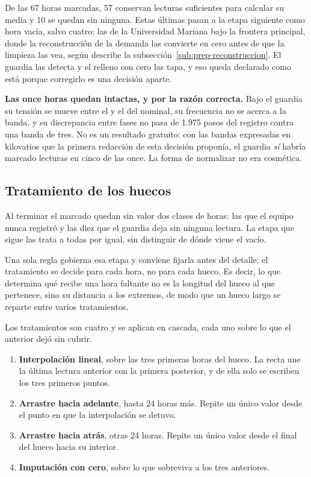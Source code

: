 De las \num{67} horas marcadas, \num{57} conservan lecturas suficientes
para calcular su media y \num{10} se quedan sin ninguna. Estas últimas
pasan a la etapa siguiente como hora vacía, salvo cuatro: las de la
Universidad Mariana bajo la frontera principal, donde la reconstrucción de
la demanda las convierte en cero antes de que la limpieza las vea, según
describe la subsección~\ref{sub:prep-reconstruccion}. El guardia las
detecta y el relleno con cero las tapa, y eso queda declarado como está
porque corregirlo es una decisión aparte.

\begin{detallebox}
\textbf{Las once horas quedan intactas, y por la razón correcta.} Bajo el
guardia su tensión se mueve entre el  y el  del nominal,
su frecuencia no se acerca a la banda, y su discrepancia entre fases no
pasa de \num{1,975} pasos del registro contra una banda de tres. No es un
resultado gratuito: con las bandas expresadas en kilovatios que la primera
redacción de esta decisión proponía, el guardia \emph{sí} habría marcado
lecturas en cinco de las once. La forma de normalizar no era cosmética.
\end{detallebox}

\subsection{Tratamiento de los huecos}
\label{sub:prep-huecos}

Al terminar el marcado quedan sin valor dos clases de horas: las que el
equipo nunca registró y las diez que el guardia deja sin ninguna lectura.
La etapa que sigue las trata a todas por igual, sin distinguir de dónde
viene el vacío.

Una sola regla gobierna esa etapa y conviene fijarla antes del detalle: el
tratamiento se decide para cada hora, no para cada hueco. Es decir, lo que
determina qué recibe una hora faltante no es la longitud del hueco al que
pertenece, sino su distancia a los extremos, de modo que un hueco largo se
reparte entre varios tratamientos.

Los tratamientos son cuatro y se aplican en cascada, cada uno sobre lo que
el anterior dejó sin cubrir.

\begin{enumerate}[leftmargin=*, itemsep=0.25em, topsep=0.35em]
 \item \textbf{Interpolación lineal}, sobre las tres primeras horas del
 hueco. La recta une la última lectura anterior con la primera posterior,
 y de ella solo se escriben los tres primeros puntos.
 \item \textbf{Arrastre hacia adelante}, hasta 24 horas más. Repite un
 único valor desde el punto en que la interpolación se detuvo.
 \item \textbf{Arrastre hacia atrás}, otras 24 horas. Repite un único
 valor desde el final del hueco hacia su interior.
 \item \textbf{Imputación con cero}, sobre lo que sobreviva a los tres
 anteriores.
\end{enumerate}

